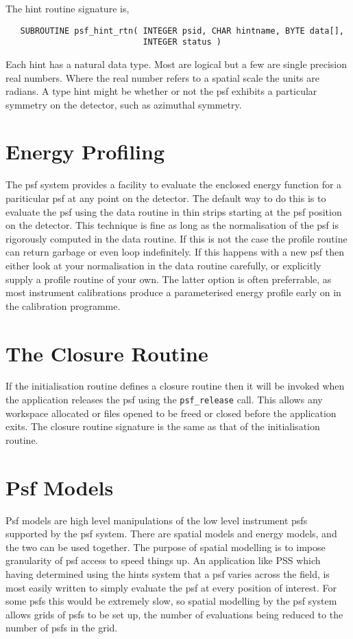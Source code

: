 The hint routine signature is,
\begin{verbatim}
   SUBROUTINE psf_hint_rtn( INTEGER psid, CHAR hintname, BYTE data[], 
                            INTEGER status )
\end{verbatim}
Each hint has a natural data type. Most are logical but a few are single
precision real numbers. Where the real number refers to a spatial scale
the units are radians. A type hint might be whether or not the psf exhibits
a particular symmetry on the detector, such as azimuthal symmetry.

\section{Energy Profiling}

The psf system provides a facility to evaluate the enclosed energy function
for a pariticular psf at any point on the detector. The default way to do
this is to evaluate the psf using the data routine in thin strips starting
at the psf position on the detector. This technique is fine as long as the
normalisation of the psf is rigorously computed in the data routine. If
this is not the case the profile routine can return garbage or even loop
indefinitely. If this happens with a new psf then either look at your
normalisation in the data routine carefully, or explicitly supply a profile
routine of your own. The latter option is often preferrable, as most
instrument calibrations produce a parameterised energy profile early on
in the calibration programme.

\section{The Closure Routine}

If the initialisation routine defines a closure routine then it will be
invoked when the application releases the psf using the
\verb+psf_release+ call. This allows any workspace allocated or files
opened to be freed or closed before the application exits. The closure
routine signature is the same as that of the initialisation routine.


\section{Psf Models}

Psf models are high level manipulations of the low level instrument psfs
supported by the psf system. There are spatial models and energy models,
and the two can be used together. The purpose of spatial modelling is
to impose granularity of psf access to speed things up. An application
like PSS which having determined using the hints system that a psf varies
across the field, is most easily written to simply evaluate the psf at
every position of interest. For some psfs this would be extremely slow,
so spatial modelling by the psf system allows grids of psfs to be set up,
the number of evaluations being reduced to the number of psfs in the grid.

